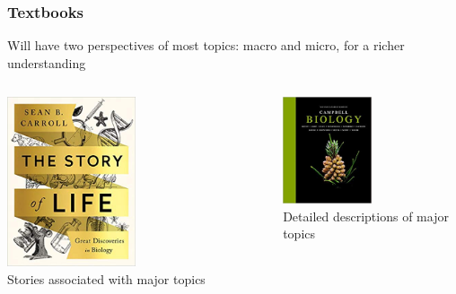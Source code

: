 \documentclass[10pt]{beamer}
\begin{document}
\begin{frame}[t]
\frametitle{Textbooks}

	\begin{center}
		Will have two perspectives of most topics: macro and micro, for a richer understanding
	\end{center}	
	
	\begin{columns}[t]
		\begin{column}{0.5\textwidth}
			\begin{center}
				\includegraphics[width=0.5\textwidth]{figures/carroll.jpg}\\
				\vspace{0.5cm}
				Stories associated with major topics
			\end{center}
		\end{column}
		
		\begin{column}{0.5\textwidth}
			\begin{center}
				\includegraphics[width=0.5\textwidth]{figures/campbell.jpg}\\
				\vspace{0.5cm}
				Detailed descriptions of major topics 
			\end{center}
		\end{column}
	\end{columns}
\end{frame}
\end{document}
